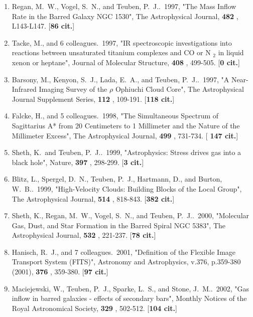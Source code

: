 \documentclass[11pt,letterpaper]{article}
\begin{document}
\begin{enumerate}[resume,label=\textbf{\arabic*}.]
\item  
Regan, M.~W., Vogel, S.~N., and Teuben, P.~J..\  1997,  "The Mass Inflow 
Rate in the Barred Galaxy NGC 1530", The Astrophysical Journal,  {\bf 482} 
, L143-L147.  [{\bf 86 cit.}] 

\item  
Tacke, M., and 6 colleagues.\  1997,  "IR spectroscopic investigations into 
reactions between unsaturated titanium complexes and CO or N $_{2}$ in 
liquid xenon or heptane", Journal of Molecular Structure,  {\bf 408} , 
499-505.  [{\bf 0 cit.}] 

\item  
Barsony, M., Kenyon, S.~J., Lada, E.~A., and Teuben, P.~J..\  1997,  "A 
Near-Infrared Imaging Survey of the {$\rho$} Ophiuchi Cloud Core", The 
Astrophysical Journal Supplement Series,  {\bf 112} , 109-191.  [{\bf 118 
cit.}] 

\item  
Falcke, H., and 5 colleagues.\  1998,  "The Simultaneous Spectrum of 
Sagittarius A* from 20 Centimeters to 1 Millimeter and the Nature of the 
Millimeter Excess", The Astrophysical Journal,  {\bf 499} , 731-734.  [{\bf 
147 cit.}] 

\item  
Sheth, K.~and Teuben, P.~J..\  1999,  "Astrophysics:  Stress drives gas 
into a black hole", Nature,  {\bf 397} , 298-299.  [{\bf 3 cit.}] 

\item  
Blitz, L., Spergel, D.~N., Teuben, P.~J., Hartmann, D., and Burton, W.~B..\  
1999,  "High-Velocity Clouds: Building Blocks of the Local Group", The 
Astrophysical Journal,  {\bf 514} , 818-843.  [{\bf 382 cit.}] 

\item  
Sheth, K., Regan, M.~W., Vogel, S.~N., and Teuben, P.~J..\  2000,  
"Molecular Gas, Dust, and Star Formation in the Barred Spiral NGC 5383", 
The Astrophysical Journal,  {\bf 532} , 221-237.  [{\bf 78 cit.}] 

\item  
Hanisch, R.~J., and 7 colleagues.\  2001,  "Definition of the Flexible 
Image Transport System (FITS)", Astronomy and Astrophysics, v.376, 
p.359-380 (2001),  {\bf 376} , 359-380.  [{\bf 97 cit.}] 

\item  
Maciejewski, W., Teuben, P.~J., Sparke, L.~S., and Stone, J.~M..\  2002,  
"Gas inflow in barred galaxies - effects of secondary bars", Monthly 
Notices of the Royal Astronomical Society,  {\bf 329} , 502-512.  [{\bf 104 
cit.}] 


\end{enumerate}
\end{document}
